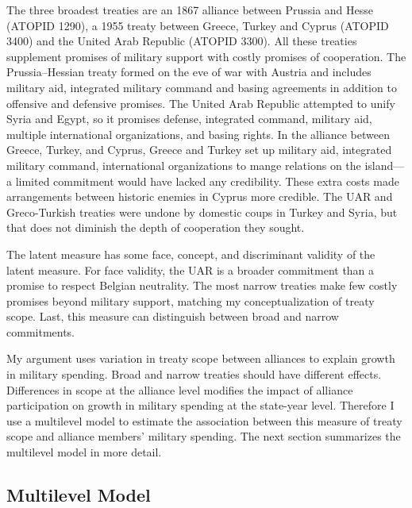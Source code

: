 \documentclass[12pt]{article}
\begin{document}
The three broadest treaties are an 1867 alliance between Prussia and Hesse (ATOPID 1290), a 1955 treaty between Greece, Turkey and Cyprus (ATOPID 3400) and the United Arab Republic (ATOPID 3300).  
All these treaties supplement promises of military support with costly promises of cooperation. 
The Prussia--Hessian treaty formed on the eve of war with Austria and includes military aid, integrated military command and basing agreements in addition to offensive and defensive promises. 
The United Arab Republic attempted to unify Syria and Egypt, so it promises defense, integrated command, military aid, multiple international organizations, and basing rights. 
In the alliance between Greece, Turkey, and Cyprus, Greece and Turkey set up military aid, integrated military command, international organizations to mange relations on the island--- a limited commitment would have lacked any credibility. 
These extra costs made arrangements between historic enemies in Cyprus more credible. 
The UAR and Greco-Turkish treaties were undone by domestic coups in Turkey and Syria, but that does not diminish the depth of cooperation they sought. 


The latent measure has some face, concept, and discriminant validity of the latent measure. 
For face validity, the UAR is a broader commitment than a promise to respect Belgian neutrality. 
The most narrow treaties make few costly promises beyond military support, matching my conceptualization of treaty scope. 
Last, this measure can distinguish between broad and narrow commitments. 


My argument uses variation in treaty scope between alliances to explain growth in military spending.
Broad and narrow treaties should have different effects. 
Differences in scope at the alliance level modifies the impact of alliance participation on growth in military spending at the state-year level. 
Therefore I use a multilevel model to estimate the association between this measure of treaty scope and alliance members' military spending.  
The next section summarizes the multilevel model in more detail. 


\subsection{Multilevel Model} 
\end{document}
